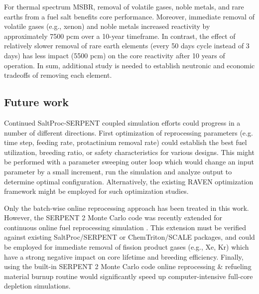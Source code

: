 For thermal spectrum \gls{MSBR}, removal of volatile gases, noble metals, and 
rare earths from a fuel salt benefits core performance.
Moreover, immediate removal of volatile gases (e.g., xenon) and noble metals 
increased reactivity by approximately 7500 pcm over a 10-year 
timeframe. In contrast, the effect of relatively slower removal of rare earth 
elements (every 50 days cycle instead of 3 days) has less impact (5500 pcm) on 
the core reactivity after 10 years of operation. In sum, additional study 
is needed to establish neutronic  and economic tradeoffs of removing each element.

\subsection{Future work}
Continued SaltProc-SERPENT coupled simulation efforts could progress in a 
number of different directions. First optimization of reprocessing parameters (e.g. time step, feeding rate, 
protactinium removal rate) could establish the best fuel utilization, breeding 
ratio, or safety characteristics for various designs. This might be performed with a parameter sweeping 
outer loop which would change an input parameter by a small increment, run the 
simulation and analyze output to determine optimal configuration. Alternatively, 
the existing RAVEN optimization framework \cite{alfonsi_raven_2013} might be 
employed for such optimization studies.

Only the batch-wise online reprocessing approach has been treated in this 
work. However, the SERPENT 2 Monte Carlo code was recently extended for 
continuous online fuel reprocessing simulation \cite{aufiero_extended_2013}. 
This extension must be verified against existing SaltProc/SERPENT or 
ChemTriton/SCALE packages, and could be employed for immediate removal of 
fission product gases (e.g., Xe, Kr) which have a strong negative impact on 
core lifetime and breeding efficiency. Finally, using the built-in SERPENT 2 
Monte Carlo code online reprocessing \& refueling material burnup routine would 
significantly speed up computer-intensive full-core depletion simulations.
